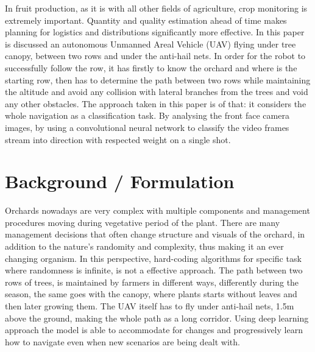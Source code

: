 \documentclass[conference]{IEEEtran}
\begin{document}
In fruit production, as it is with all other fields of agriculture, crop monitoring is extremely important. Quantity and quality estimation ahead of time makes planning for logistics and distributions significantly more effective. In this paper is discussed an autonomous Unmanned Areal Vehicle (UAV) flying under tree canopy, between two rows and under the anti-hail nets. In order for the robot to successfully follow the row, it has firstly to know the orchard and where is the starting row, then has to determine the path between two rows while maintaining the altitude and avoid any collision with lateral branches from the trees and void any other obstacles. The approach taken in this paper is of that: it considers the whole navigation as a classification task. By analysing the front face camera images, by using a convolutional neural network to classify the video frames stream into direction with respected weight on a single shot.

\section{Background / Formulation}
Orchards nowadays are very complex with multiple components and management procedures moving during vegetative period of the plant. There are many management decisions that often change structure and visuals of the orchard, in addition to the nature's randomity and complexity, thus making it an ever changing organism. In this perspective, hard-coding algorithms for specific task where randomness is infinite, is not a effective approach. The path between two rows of trees, is maintained by farmers in different ways, differently during the season, the same goes with the canopy, where plants starts without leaves and then later growing them. The UAV itself has to fly under anti-hail nets, 1.5m above the ground, making the whole path as a long corridor. Using deep learning approach the model is able to accommodate for changes and progressively learn how to navigate even when new scenarios are being dealt with.
\end{document}
